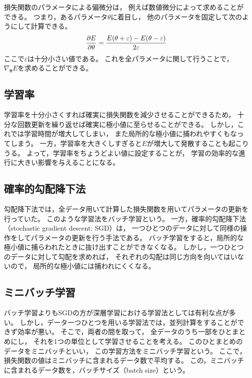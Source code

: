 \documentclass[class=jsarticle, crop=false, dvipdfmx, fleqn]{standalone}
\begin{document}
損失関数のパラメータによる偏微分は，
例えば数値微分によって求めることができる。
つまり，あるパラメータ$\theta$に着目し，
他のパラメータを固定して次のようにして計算できる。
\begin{equation}
\pdv{E}{\theta} = \frac{E(\theta + \varepsilon) - E(\theta - \varepsilon)}{2 \varepsilon}
\end{equation}
ここで$\varepsilon$は十分小さい値である。
これを全パラメータに関して行うことで，
$\nabla_{\bm{\theta}} E$を求めることができる。


\subsection{学習率}

学習率を十分小さくすれば確実に損失関数を減少させることができるため，
十分な回数更新を繰り返せば確実に極小値に至らせることができる。
しかし，これでは学習時間が増大してしまい，
また局所的な極小値に捕われやすくもなってしまう。
一方，学習率を大きくしすぎると$E$が増大して発散することも起こりうる。
よって，学習率をちょうどよい値に設定することが，
学習の効率的な進行に大きい影響を与えることになる。


\subsection{確率的勾配降下法}

勾配降下法では，全データ用いて計算した損失関数を用いてパラメータの更新を行っていた。
このような学習法をバッチ学習という。
一方，確率的勾配降下法（stochastic gradient descent: SGD）は，
一つひとつのデータに対して同様の操作をしてパラメータの更新を行う手法である。
バッチ学習をすると，局所的な極小値に捕らわれたときに抜け出すことができなくなる。
しかし，一つひとつのデータに対して勾配を求めれば，
それぞれの勾配は同じ方向を向いてはいないので，
局所的な極小値には捕われにくくなる。


\subsection{ミニバッチ学習}

バッチ学習よりもSGDの方が深層学習における学習法としては有利な点が多い。
しかし，データ一つひとつを用いる学習法では，並列計算をすることができず効率が悪い。
そこで，両者の間を取って，
全データのうち一部をひとまとめにし，
それを1つの単位として学習させることを考える。
このひとまとめのデータをミニバッチといい，
この学習方法をミニバッチ学習という。
ここで，損失関数の値はミニバッチに含まれるデータ数で平均する。
この，ミニバッチに含まれるデータ数を，バッチサイズ（batch size）という。
\end{document}
